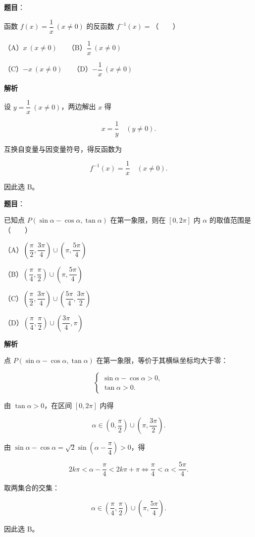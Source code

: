 \begin{answer}

\textbf{题目}：

函数 $f(x)=\dfrac1x\ (x\ne0)$ 的反函数 $f^{-1}(x)=$\mbox{（　　）}

（A）$x\ (x\ne0)$　　（B）$\dfrac1x\ (x\ne0)$

（C）$-x\ (x\ne0)$　　（D）$-\dfrac1x\ (x\ne0)$

\textbf{解析}

设 $y = \dfrac1x\ (x\ne0)$，两边解出 $x$ 得

\nopagebreak[4]
\[
x = \frac1y\quad (y\ne0).
\]

互换自变量与因变量符号，得反函数为

\nopagebreak[4]
\[
f^{-1}(x) = \frac1x\quad (x\ne0).
\]

因此选 B。


\end{answer}
\begin{answer}

\textbf{题目}：

已知点 $P(\sin\alpha-\cos\alpha,\tan\alpha)$ 在第一象限，则在 $[0,2\pi]$ 内 $\alpha$ 的取值范围是\mbox{（　　）}

（A）$\left(\dfrac\pi2,\dfrac{3\pi}4\right)\cup\left(\pi,\dfrac{5\pi}4\right)$

（B）$\left(\dfrac\pi4,\dfrac\pi2\right)\cup\left(\pi,\dfrac{5\pi}4\right)$

（C）$\left(\dfrac\pi2,\dfrac{3\pi}4\right)\cup\left(\dfrac{5\pi}4,\dfrac{3\pi}2\right)$

（D）$\left(\dfrac\pi4,\dfrac\pi2\right)\cup\left(\dfrac{3\pi}4,\pi\right)$

\textbf{解析}

点 $P(\sin\alpha-\cos\alpha,\tan\alpha)$ 在第一象限，等价于其横纵坐标均大于零：

\nopagebreak[4]
\[
\begin{cases}
\sin\alpha - \cos\alpha > 0,\\
\tan\alpha > 0.
\end{cases}
\]

由 $\tan\alpha>0$，在区间 $[0,2\pi]$ 内得

\nopagebreak[4]
\[
\alpha \in \left(0,\frac\pi2\right) \cup \left(\pi, \frac{3\pi}{2}\right).
\]

由 $\sin\alpha-\cos\alpha = \sqrt2\sin\left(\alpha-\dfrac\pi4\right) > 0$，得

\nopagebreak[4]
\[
2k\pi < \alpha - \frac\pi4 < 2k\pi + \pi \iff \frac\pi4 < \alpha < \frac{5\pi}4.
\]

取两集合的交集：

\nopagebreak[4]
\[
\alpha \in \left(\frac\pi4, \frac\pi2\right) \cup \left(\pi, \frac{5\pi}{4}\right).
\]

因此选 B。


\end{answer}
